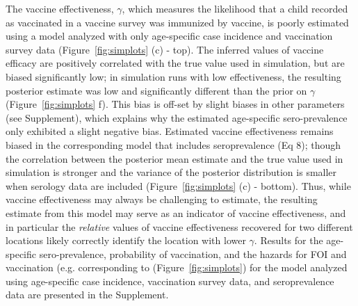 \documentclass[nofootinbib,aps,pre,twocolumn,superscriptaddress,showkeys,showpacs]{revtex4-1}
\begin{document}
The vaccine effectiveness, $\gamma$, which measures the likelihood that a child recorded as vaccinated in a vaccine survey was immunized by vaccine, is poorly estimated using a model analyzed with only age-specific case incidence and vaccination survey data (Figure~\ref{fig:simplots} (c) - top).  The inferred values of vaccine efficacy are positively correlated with the true value used in simulation, but are biased significantly low; in simulation runs with low effectiveness, the resulting posterior estimate was low and significantly different than the prior on $\gamma$ (Figure~\ref{fig:simplots} f).  This bias is off-set by slight biases in other parameters (see Supplement), which explains why the estimated age-specific sero-prevalence only exhibited a slight negative bias. Estimated vaccine effectiveness remains biased in the corresponding model that includes seroprevalence (Eq 8); though the correlation between the posterior mean estimate and the true value used in simulation is stronger and the variance of the posterior distribution is smaller when serology data are included (Figure~\ref{fig:simplots} (c) - bottom).  Thus, while vaccine effectiveness may always be challenging to estimate, the resulting estimate from this model may serve as an indicator of vaccine effectiveness, and in particular the \emph{relative} values of vaccine effectiveness recovered for two different locations likely correctly identify the location with lower $\gamma$.  Results for the age-specific sero-prevalence, probability of vaccination, and the hazards for FOI and vaccination (e.g. corresponding to (Figure~\ref{fig:simplots}) for the model analyzed using age-specific case incidence, vaccination survey data, and seroprevalence data are presented in the Supplement.

\end{document}
